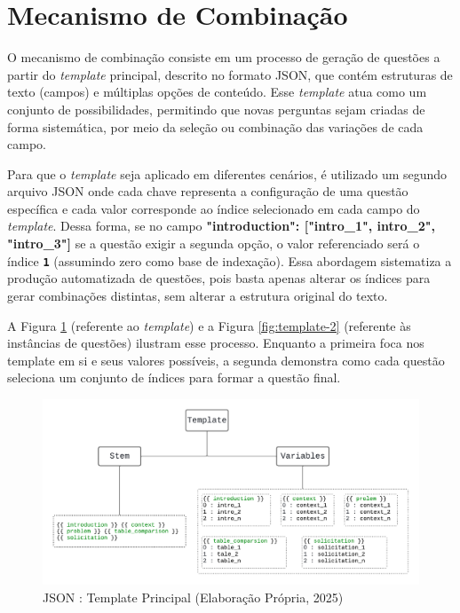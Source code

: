 \section{Mecanismo de Combinação}

O mecanismo de combinação consiste em um processo de geração de questões a partir do \textit{template} principal, descrito no formato JSON, que contém estruturas de texto (campos) e múltiplas opções de conteúdo. Esse \textit{template} atua como um conjunto de possibilidades, permitindo que novas perguntas sejam criadas de forma sistemática, por meio da seleção ou combinação das variações de cada campo.

Para que o \textit{template} seja aplicado em diferentes cenários, é utilizado um segundo arquivo JSON onde cada chave representa a configuração de uma questão específica e cada valor corresponde ao índice selecionado em cada campo do \textit{template}. Dessa forma, se no campo \textbf{"introduction": ["intro\_1", intro\_2", "intro\_3"]} se a questão exigir a segunda opção, o valor referenciado será o índice \texttt{\textbf{1}} (assumindo zero como base de indexação). Essa abordagem sistematiza a produção automatizada de questões, pois basta apenas alterar os índices para gerar combinações distintas, sem alterar a estrutura original do texto.

A Figura \ref{fig:template-1} (referente ao \textit{template}) e a Figura \ref{fig:template-2} (referente às instâncias de questões) ilustram esse processo. Enquanto a primeira foca nos template em si e seus valores possíveis, a segunda demonstra como cada questão seleciona um conjunto de índices para formar a questão final. 

\begin{figure}[ht]
	\centering
	\includegraphics[width=16cm]{./imagens/capitulo5/template-1}
	\caption{JSON : Template Principal (Elaboração Própria, 2025) }
	\label{fig:template-1}
\end{figure}

